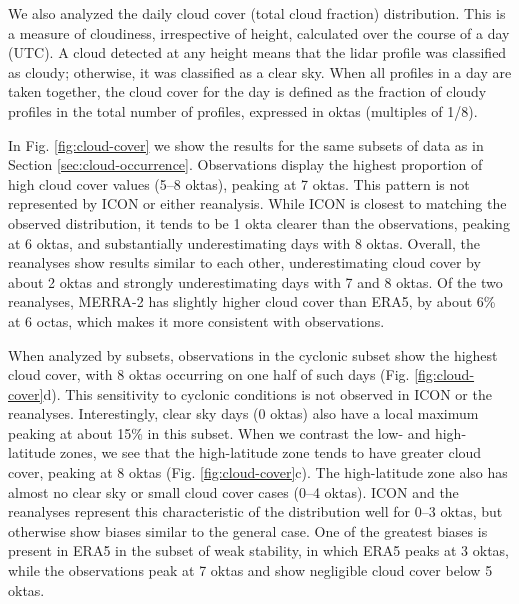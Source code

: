 \documentclass[draft]{agujournal2019}
\begin{document}
We also analyzed the daily cloud cover (total cloud fraction) distribution. This is a measure of cloudiness, irrespective of height, calculated over the course of a day (UTC). A cloud detected at any height means that the lidar profile was classified as cloudy; otherwise, it was classified as a clear sky. When all profiles in a day are taken together, the cloud cover for the day is defined as the fraction of cloudy profiles in the total number of profiles, expressed in oktas (multiples of 1/8).

In Fig. \ref{fig:cloud-cover} we show the results for the same subsets of data as in Section \ref{sec:cloud-occurrence}. Observations display the highest proportion of high cloud cover values (5--8 oktas), peaking at 7 oktas. This pattern is not represented by ICON or either reanalysis. While ICON is closest to matching the observed distribution, it tends to be 1 okta clearer than the observations, peaking at 6 oktas, and substantially underestimating days with 8 oktas. Overall, the reanalyses show results similar to each other, underestimating cloud cover by about 2 oktas and strongly underestimating days with 7 and 8 oktas. Of the two reanalyses, MERRA-2 has slightly higher cloud cover than ERA5, by about 6\% at 6 octas, which makes it more consistent with observations.

When analyzed by subsets, observations in the cyclonic subset show the highest cloud cover, with 8 oktas occurring on one half of such days (Fig. \ref{fig:cloud-cover}d). This sensitivity to cyclonic conditions is not observed in ICON or the reanalyses. Interestingly, clear sky days (0 oktas) also have a local maximum peaking at about 15\% in this subset. When we contrast the low- and high-latitude zones, we see that the high-latitude zone tends to have greater cloud cover, peaking at 8 oktas (Fig. \ref{fig:cloud-cover}c). The high-latitude zone also has almost no clear sky or small cloud cover cases (0--4 oktas). ICON and the reanalyses represent this characteristic of the distribution well for 0--3 oktas, but otherwise show biases similar to the general case. One of the greatest biases is present in ERA5 in the subset of weak stability, in which ERA5 peaks at 3 oktas, while the observations peak at 7 oktas and show negligible cloud cover below 5 oktas.
\end{document}
